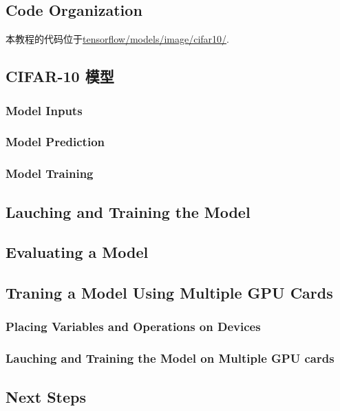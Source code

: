 \subsection {Code Organization}

本教程的代码位于\href{https://tensorflow.googlesource.com/tensorflow/+/master/tensorflow/models/image/cifar10/}{tensorflow/models/image/cifar10/}.


\subsection {CIFAR-10 模型}


\subsubsection {Model Inputs}

\subsubsection {Model Prediction}

\subsubsection {Model Training}

\subsection {Lauching and Training the Model}

\subsection {Evaluating a Model}

\subsection {Traning a Model Using Multiple GPU Cards}

\subsubsection {Placing Variables and Operations on Devices}

\subsubsection {Lauching and Training the Model on Multiple GPU cards}

\subsection {Next Steps}



